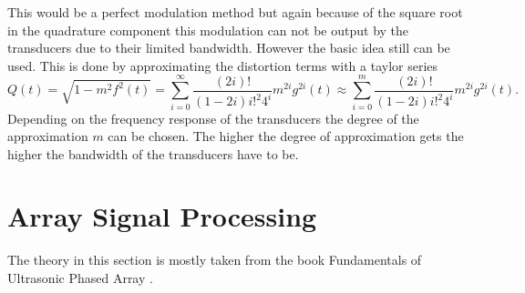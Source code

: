 This would be a perfect modulation method but again because of the square root in the quadrature component this modulation can not be output by the transducers due to their limited bandwidth. However the basic idea still can be used. This is done by approximating the distortion terms with a taylor series
\begin{equation}
    Q(t) 
    = 
    \sqrt{1 - m^2f^2(t)}
    = 
    \sum_{i=0}^\infty \frac{(2i)!}{(1-2i) i!^2 4^i}m^{2i}g^{2i}(t) 
    \approx 
    \sum_{i=0}^m \frac{(2i)!}{(1-2i) i!^2 4^i}m^{2i}g^{2i}(t).
    \label{3_eq:mam_distortion_approx}
\end{equation}
Depending on the frequency response of the transducers the degree of the approximation $m$ can be chosen. The higher the degree of approximation gets the higher the bandwidth of the transducers have to be.
\newpage

\section{Array Signal Processing}\label{3_Parametric_array_Sec:Array_signal_processing}
The theory in this section is mostly taken from the book Fundamentals of Ultrasonic Phased Array \cite{alma99116706330905515}.
